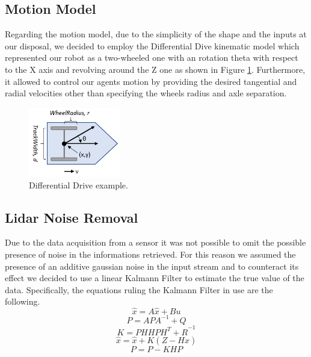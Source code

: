 \documentclass[twocolumn, a4paper]{article}
\begin{document}
\subsection{Motion Model}
Regarding the motion model, due to the simplicity of the shape and the inputs
at our disposal, we decided to employ the Differential Dive kinematic model
which represented our robot as a two-wheeled one with an rotation theta with 
respect to the X axis and revolving around the Z one as shown in Figure
\ref{fig:Motion_model}. Furthermore, it allowed
to control our agents motion by providing the desired tangential
and radial velocities other than specifying the wheels radius and axle
separation.
\begin{figure}[h]
    \centering
    \includegraphics[width=4cm]{"../Report_images/diffdrive_model_matlab"}
    \caption{Differential Drive example.}
    \label{fig:Motion_model}
\end{figure}
\subsection{Lidar Noise Removal}
Due to the data acquisition from a sensor it was not possible to
omit the possible presence of noise in the informations retrieved.
For this reason we assumed the presence of an additive gaussian noise in
the input stream and to counteract its effect we decided to
use a linear Kalmann Filter to estimate the true value of the data.
Specifically, the equations ruling the Kalmann Filter in use are the following.
\begin{equation}
    \hat{x} = A\hat{x} + Bu
\end{equation}
\begin{equation}
    P = APA^{-1} + Q
\end{equation}
\begin{equation}
    K = PH{HPH^{T} + R}^{-1}
\end{equation}
\begin{equation}
    \hat{x} = \hat{x} + K(Z - H\hat{x})  
\end{equation}
\begin{equation}
    P = P - KHP  
\end{equation}
\end{document}
